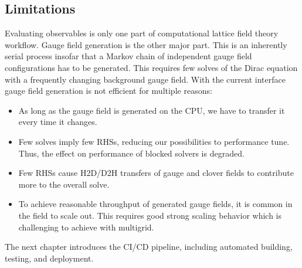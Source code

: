 \subsection{Limitations}

Evaluating observables is only one part of computational lattice field theory workflow.
Gauge field generation is the other major part.
This is an inherently serial process insofar that a Markov chain of independent gauge field configurations has to be generated.
This requires few solves of the Dirac equation with a frequently changing background gauge field.
With the current interface gauge field generation is not efficient for multiple reasons:
\begin{itemize}
    \item As long as the gauge field is generated on the CPU, we have to transfer it every time it changes.
    \item Few solves imply few RHSs, reducing our possibilities to performance tune. Thus, the effect on performance of blocked solvers is degraded.
    \item Few RHSs cause H2D/D2H transfers of gauge and clover fields to contribute more to the overall solve.
    \item To achieve reasonable throughput of generated gauge fields, it is common in the field to scale out. This requires good strong scaling behavior which is challenging to achieve with multigrid.
\end{itemize}

The next chapter introduces the CI/CD pipeline, including automated building, testing, and deployment.




